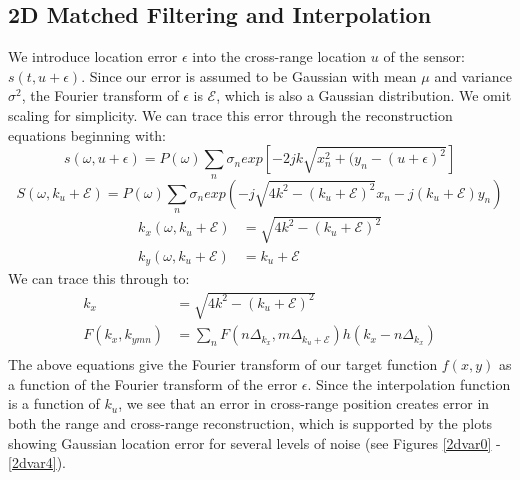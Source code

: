 \documentclass{article}
\begin{document}
\subsection{2D Matched Filtering and Interpolation}
We introduce location error $\epsilon$ into the cross-range location $u$ of the sensor: \( s(t,u + \epsilon) \). Since our error is assumed to be Gaussian with mean $\mu$ and variance $\sigma^2$, the Fourier transform of $\epsilon$ is $\mathcal{E}$, which is also a Gaussian distribution. We omit scaling for simplicity. We can trace this error through the reconstruction equations beginning with:
\begin{displaymath}
	s( \omega , u + \epsilon) = P( \omega) \sum\limits_{n}^{} \sigma_{n} exp\left[ -2jk \sqrt{x_{n}^2 +(y_{n} - (u + \epsilon)^2} \right]
\end{displaymath}
\begin{displaymath}
	S( \omega , k_{u} + \mathcal{E}) = P(\omega) \sum\limits_{n}^{} \sigma_{n}exp(-j \sqrt{4 k^2 - (k_{u} + \mathcal{E})^2} x_{n} - j (k_{u}+\mathcal{E}) y_{n} ) 
\end{displaymath}
\begin{align*}
	k_{x}(\omega , k_{u} + \mathcal{E}) &= \sqrt{4 k^2 - (k_{u}+\mathcal{E})^2} \\
	k_{y}(\omega , k_{u}+ \mathcal{E}) &= k_{u} + \mathcal{E}
\end{align*}
We can trace this through to:
\begin{align*}
	k_{x} &= \sqrt{4 k^2 - (k_{u} + \mathcal{E})^2} \\
	F(k_{x} , k_{ymn}) &= \sum\limits_{n}^{} F(n \Delta_{k_{x}} , m \Delta_{k_{u}+\mathcal{E}}) h(k_{x} - n \Delta_{k_{x}}) \\
\end{align*}
The above equations give the Fourier transform of our target function $f(x,y)$ as a function of the Fourier transform of the error $\epsilon$. Since the interpolation function is a function of $k_u$, we see that an error in cross-range position creates error in both the range and cross-range reconstruction, which is supported by the plots showing Gaussian location error for several levels of noise (see Figures \ref{2dvar0} - \ref{2dvar4}).
\end{document}

